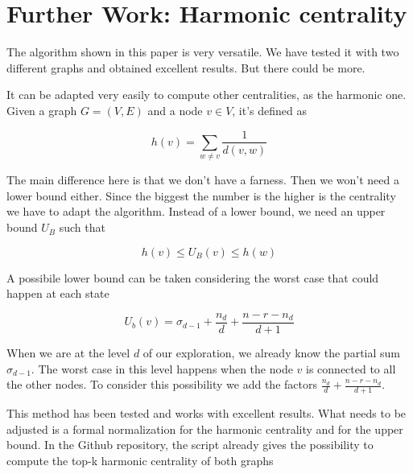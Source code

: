 \section{Further Work: Harmonic centrality}

The algorithm shown in this paper is very versatile. We have tested it with two different graphs and obtained excellent results. But there could be more.

\s \nd It can be adapted very easily to compute other centralities, as the harmonic one. Given a graph $G = (V,E)$ and a node $v \in V$, it's defined as

\begin{equation}
    h(v) = \sum_{w \neq v} \frac{1}{d(v,w)}
\end{equation}

\nd The main difference here is that we don't have a farness. Then we won't need a lower bound either. Since the biggest the number is the higher is the centrality we have to adapt the algorithm. Instead of a lower bound, we need an upper bound $U_B$ such that

\begin{equation}
    h(v) \leq U_B (v) \leq h(w)
\end{equation}

\nd A possibile lower bound can be taken considering the worst case that could happen at each state

\begin{equation}
    U_b (v) = \sigma_{d-1} + \frac{n_d}{d} + \frac{n - r - n_d}{d+1}
\end{equation}

\nd When we are at the level $d$ of our exploration, we already know the partial sum $\sigma_{d-1}$. The worst case in this level happens when the node $v$ is connected to all the other nodes. To consider this possibility we add the factors $\frac{n_d}{d} + \frac{n - r - n_d}{d+1}$.

\s \nd This method has been tested and works with excellent results. What needs to be adjusted is a formal normalization for the harmonic centrality and for the upper bound. In the Github repository, the script already gives the possibility to compute the top-k harmonic centrality of both graphs

